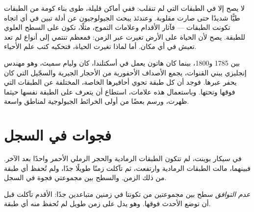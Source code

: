 لا يصح  إلا في الطبقات التي لم تنقلب: ففي أماكن قليلة، طوى
بناء  كومة من الطبقات طيًّا شديدًا حتى صارت مقلوبة. وعندئذ يبحث
الجيولوجيون عن أدلة تبين في أي اتجاه تكونت الطبقات --- فآثار الأقدام
وعلامات التموج، مثلًا، تكون على السطح العلوي للطبقة.  يصح لأن الحياة على الأرض تغيرت عبر الزمن: فمعظم  تنتمي
إلى أنواع لم تعد تعيش في أي مكان. أما لماذا تغيرت الحياة، فتحكيه كتب
علم الأحياء.

\begin{history}
بين 1785 و1800، بينما كان هاتون يعمل في أسكتلندا، كان وليام سميث، وهو
مهندس إنجليزي يبني القنوات، يجمع الأصداف الأحفورية من الأحجار الجيرية
والسجّيل التي كان يحفر عبرها. فوجد أن كل طبقة تحوي أحافيرها الخاصة،
المختلفة عن  الطبقات التي فوقها وتحتها. وباستعمال هذه 
علامات، استطاع أن يتعرف على الطبقة نفسها حيثما ظهرت، ورسم بعضًا من أولى
الخرائط الجيولوجية لمناطق واسعة.
\end{history}

\section{فجوات في السجل}

في سيكار بوينت، لم تتكون الطبقات الرمادية والحجر الرملي الأحمر واحدًا بعد
الآخر. فبينهما، مالت الطبقات الرمادية وارتفعت، ثم تآكلت زمنًا طويلًا
جدًا، ولم تُحفظ أي طبقة من ذلك الزمن. والسطح بين مجموعتي  فجوة في
السجل.

\begin{definition}\label{def:g7:geological-time:unconformity}
\emph{عدم التوافق} سطح  بين مجموعتين من 
تكونتا في زمنين متباعدين جدًا:  الأقدم تآكلت قبل أن توضع الأحدث
فوقها. وهو يدل على زمن طويل لم تُحفظ منه أي طبقة.
\end{definition}

